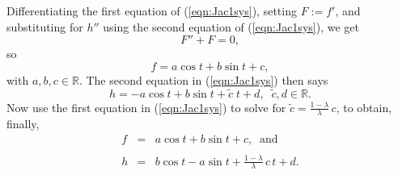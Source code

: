 \documentclass[12pt,reqno]{amsart}\usepackage{amssymb,amsmath,amscd,epsfig,amsthm,enumerate,import,eufrak}
\theoremstyle{definition}
\theoremstyle{remark}
\numberwithin{equation}{section}
\theoremstyle{plain}
\theoremstyle{definition}
\def \r {\mathbb{R}}
\def \vs {\vskip 2mm}
\theoremstyle{remark}
\numberwithin{theorem}{section}
\begin{document}
%
\vs
%
%
Differentiating the first equation of (\ref{eqn:Jac1sys}), setting $F := f'$, and substituting for $h''$ using the second equation of (\ref{eqn:Jac1sys}), we get
%
\vs
%
\[
	F'' + F = 0,
\]
%
\vs
%
so 
%
\begin{equation}\label{eqn:f}
	f =a \cos t + b \sin t + c,
\end{equation}
%
\vs
%
with $a, b, c \in \r$. The second equation in (\ref{eqn:Jac1sys}) then says 
%
\vs
%
\[
	h = - a \cos t + b \sin t + \tilde{c}\; t + d, \;\; \tilde{c}, d \in \r.
\]
%
\vs
%
Now use the first equation in (\ref{eqn:Jac1sys}) to solve for $\tilde{c} = \frac{1-\lambda}{\lambda} \, c$, to obtain, finally,
%
\vs
%
\begin{equation}\label{eqn:Jac1soln}
	\begin{array}{rcl} f & = & a \cos t + b \sin t + c, \;\; \text{and} \\ && \\ h & = & b \cos t - a \sin t + \frac{1- \lambda}{\lambda} \, c \, t + d. \end{array}
\end{equation}
%
\vs\vs\vs
%
%
%
\end{document}
